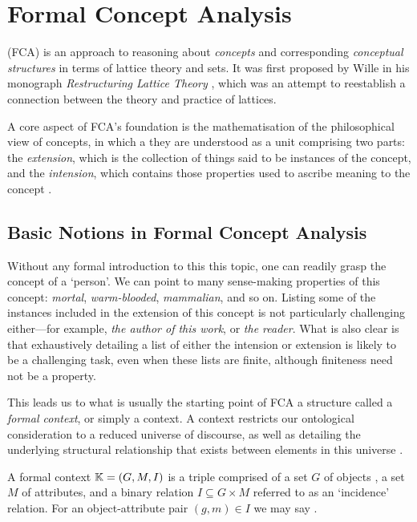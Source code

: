 \chapter{Formal Concept Analysis}
\label{chapter:formal-concept-analysis}

\FCA (FCA) \cite{Wille_Restructuring,WILLE1992493,ganter1999formal} is an approach to reasoning about \textit{concepts} and
corresponding \textit{conceptual structures} in terms of lattice theory and sets. It was first proposed by Wille in his monograph
\textit{Restructuring Lattice Theory} \cite{Wille_Restructuring}, which was an attempt to reestablish a connection between
the theory and practice of lattices.

A core aspect of FCA’s foundation is the mathematisation of the philosophical view of concepts, in which a they are
understood as a unit comprising two parts: the \textit{extension}, which is the collection of things said to be instances
of the concept, and the \textit{intension}, which contains those properties used to ascribe meaning to the concept
\cite{DUQUENNE1999407}.

\section{Basic Notions in Formal Concept Analysis}
\label{section:basic-notions}

Without any formal introduction to this this topic, one can readily grasp the concept of a `person'. We can point to many
sense-making properties of this concept: \textit{mortal}, \textit{warm-blooded}, \textit{mammalian}, and so on. Listing some
of the instances included in the extension of this concept is not particularly challenging either---for example, \textit{the
author of this work}, or \textit{the reader}. What is also clear is that exhaustively detailing a list of either the
intension or extension is likely to be a challenging task, even when these lists are finite, although finiteness need
not be a property.

This leads us to what is usually the starting point of FCA a structure called a \textit{formal context}, or simply a
context. A context restricts our ontological consideration to a reduced universe of discourse, as well as detailing the
underlying structural relationship that exists between elements in this universe \cite{Wille_Restructuring,Dau2005}.

\begin{definition}
	 \label{definition:formal-context} A formal context $\mathbb{K} = (G,M,\mathrel{I})$ is a triple comprised of a
	set $G$ of objects , a set $M$ of attributes, and a binary relation $I \subseteq G \times M$ referred to as an `incidence'
	relation. For an object-attribute pair $(g,m) \in I$ we may say .
\end{definition}

